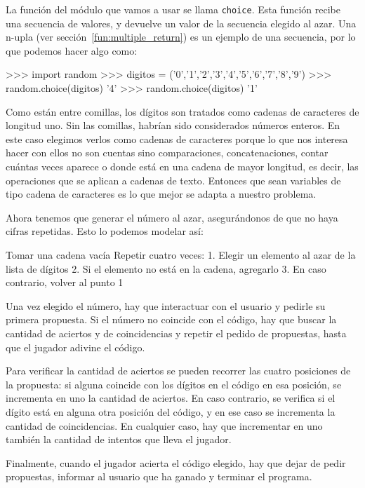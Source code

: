 \begin{enumerate}
La función del módulo que vamos a usar se llama \lstinline!choice!. Esta función
recibe una secuencia de valores, y devuelve un valor de la secuencia elegido al
azar. Una n-upla (ver sección~\ref{fun:multiple_return}) es un ejemplo de una
secuencia, por lo que podemos hacer algo como:

\begin{codigo-python-sn}
>>> import random
>>> digitos = ('0','1','2','3','4','5','6','7','8','9')
>>> random.choice(digitos)
'4'
>>> random.choice(digitos)
'1'
\end{codigo-python-sn}

Como están entre comillas, los dígitos son tratados como cadenas de caracteres
de longitud uno. Sin las comillas, habrían sido considerados números enteros. En
este caso elegimos verlos como cadenas de caracteres porque lo que nos interesa
hacer con ellos no son cuentas sino comparaciones, concatenaciones, contar
cuántas veces aparece o donde está en una cadena de mayor longitud, es decir,
las operaciones que se aplican a cadenas de texto. Entonces que sean
variables de tipo cadena de caracteres es lo que mejor se adapta a nuestro
problema.

Ahora tenemos que generar el número al azar, asegurándonos de que no haya cifras
repetidas. Esto lo podemos modelar así:

\begin{codigo-nohl-sn}
Tomar una cadena vacía
Repetir cuatro veces:
    1. Elegir un elemento al azar de la lista de dígitos
    2. Si el elemento no está en la cadena, agregarlo
    3. En caso contrario, volver al punto 1
\end{codigo-nohl-sn}

Una vez elegido el número, hay que interactuar con el usuario y pedirle su
primera propuesta. Si el número no coincide con el código, hay que buscar la
cantidad de aciertos y de coincidencias y repetir el pedido de propuestas, hasta
que el jugador adivine el código.

Para verificar la cantidad de aciertos se pueden recorrer las cuatro posiciones
de la propuesta: si alguna coincide con los dígitos en el código en esa
posición, se incrementa en uno la cantidad de aciertos. En caso contrario, se
verifica si el dígito está en alguna otra posición del código, y en ese caso se
incrementa la cantidad de coincidencias. En cualquier caso, hay que incrementar
en uno también la cantidad de intentos que lleva el jugador.

Finalmente, cuando el jugador acierta el código elegido, hay que dejar de pedir
propuestas, informar al usuario que ha ganado y terminar el programa.


\end{enumerate}

